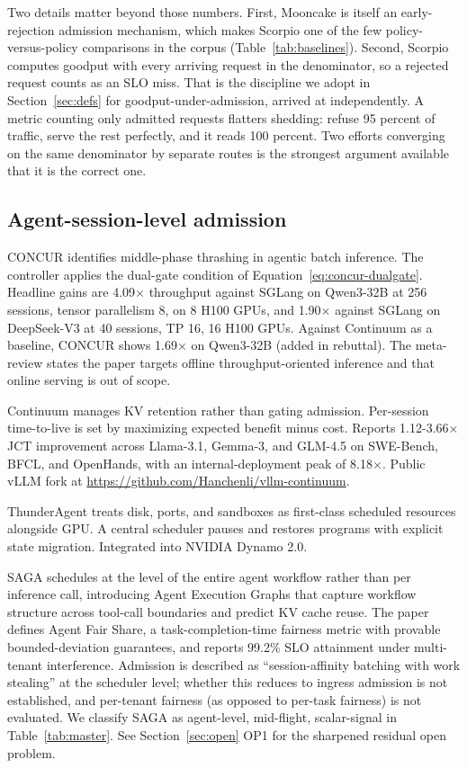 \documentclass[11pt,letterpaper]{article}
\theoremstyle{definition}
\begin{document}
Two details matter beyond those numbers. First, Mooncake is itself an
early-rejection admission mechanism, which makes Scorpio one of the few
policy-versus-policy comparisons in the corpus
(Table~\ref{tab:baselines}). Second, Scorpio computes goodput with every
arriving request in the denominator, so a rejected request counts as an
SLO miss. That is the discipline we adopt in
Section~\ref{sec:defs} for goodput-under-admission, arrived at
independently. A metric counting only admitted requests flatters
shedding: refuse 95 percent of traffic, serve the rest perfectly, and it
reads 100 percent. Two efforts converging on the same denominator by
separate routes is the strongest argument available that it is the
correct one.

\subsection{Agent-session-level admission}

CONCUR \cite{chen2026concur} identifies middle-phase thrashing in
agentic batch inference. The controller applies the dual-gate
condition of Equation~\ref{eq:concur-dualgate}. Headline gains are
4.09$\times$ throughput against SGLang on Qwen3-32B at 256 sessions,
tensor parallelism 8, on 8 H100 GPUs, and 1.90$\times$ against SGLang
on DeepSeek-V3 at 40 sessions, TP 16, 16 H100 GPUs. Against Continuum
as a baseline, CONCUR shows 1.69$\times$ on Qwen3-32B (added in
rebuttal). The meta-review states the paper targets offline
throughput-oriented inference and that online serving is out of scope.

Continuum \cite{li2026continuum} manages KV retention rather than
gating admission. Per-session time-to-live is set by maximizing
expected benefit minus cost. Reports 1.12-3.66$\times$ JCT improvement
across Llama-3.1, Gemma-3, and GLM-4.5 on SWE-Bench, BFCL, and
OpenHands, with an internal-deployment peak of 8.18$\times$. Public
vLLM fork at \url{https://github.com/Hanchenli/vllm-continuum}.

ThunderAgent \cite{kang2026thunderagent} treats disk, ports, and
sandboxes as first-class scheduled resources alongside GPU. A central
scheduler pauses and restores programs with explicit state migration.
Integrated into NVIDIA Dynamo 2.0.

SAGA \cite{guo2026saga} schedules at the level of the entire agent
workflow rather than per inference call, introducing Agent Execution
Graphs that capture workflow structure across tool-call boundaries
and predict KV cache reuse. The paper defines Agent Fair Share, a
task-completion-time fairness metric with provable bounded-deviation
guarantees, and reports 99.2\% SLO attainment under multi-tenant
interference. Admission is described as ``session-affinity batching
with work stealing'' at the scheduler level; whether this reduces to
ingress admission is not established, and per-tenant fairness (as
opposed to per-task fairness) is not evaluated. We classify SAGA as
agent-level, mid-flight, scalar-signal in Table~\ref{tab:master}.
See Section~\ref{sec:open} OP1 for the sharpened residual open
problem.
\end{document}
